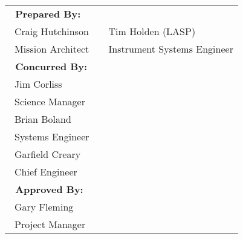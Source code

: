 % 
\bfseries
\sffamily
{}
\vspace{0.1in}
\raggedright
\normalfont
\begin{table}[htbp]
\begin{minipage}{\linewidth}
\centering
\small
\begin{tabulary}{\textwidth}{p{3.325in}p{0.225in}p{2.5in}}
\bfseries{~Prepared By:} & & \\[0.35in]
\cmidrule(l){1-1}\cmidrule(l){3-3}
~Craig Hutchinson & & Tim Holden (LASP)\\
~Mission Architect & & Instrument Systems Engineer\\[0.25in]
\bfseries{~Concurred By:} & & \\[0.35in]
\cmidrule(l){1-1}%
~Jim Corliss & &  \\
~Science Manager & &  \\[0.35in]
\cmidrule(l){1-1}%
~Brian Boland & &  \\
~Systems Engineer & &  \\[0.35in]
\cmidrule(l){1-1}%
~Garfield Creary & &  \\
~Chief Engineer & &  \\[0.25in]
\bfseries{~Approved By:} & & \\[0.35in]
\cmidrule(l){1-1}%
~Gary Fleming & &  \\
~Project Manager & &  \\[0.4in]
\end{tabulary}
\end{minipage}
\end{table}


\clearpage

